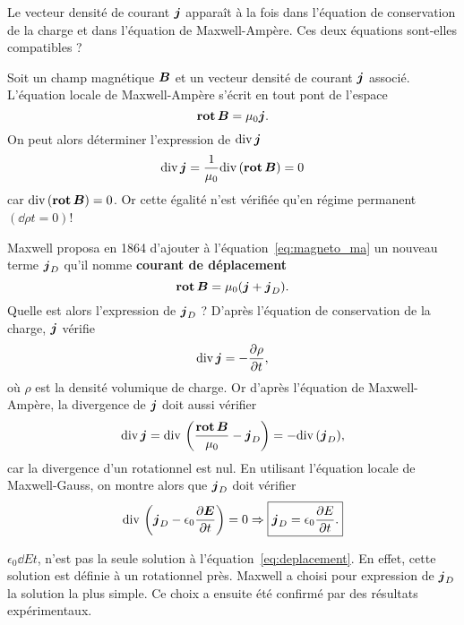 Le vecteur densité de courant $\vecj$ apparaît à la fois dans l'équation 
de conservation de la charge et dans l'équation de Maxwell-Ampère. Ces deux
équations sont-elles compatibles ?

Soit un champ magnétique $\vecb$ et un vecteur densité de courant $\vecj$ 
associé. L'équation locale de Maxwell-Ampère s'écrit en tout pont de l'espace
\begin{equation*}
	\rot \vecb = \mu_0 \vecj.
\end{equation*}
On peut alors déterminer l'expression de $\div \vecj$
\begin{equation*}
	\div \vecj = \dfrac{1}{\mu_0} \div(\rot \vecb) = 0
\end{equation*}
car $\div(\rot \vecb) = 0$. Or cette égalité n'est vérifiée qu'en régime permanent 
$\left(\dd{\rho}{t} = 0 \right)$!

Maxwell proposa en 1864 d'ajouter à l'équation~\ref{eq:magneto_ma} un nouveau terme 
$\vecj_D$ qu'il nomme \textbf{courant de déplacement}
\begin{equation*}
	\rot \vecb = \mu_0 (\vecj + \vecj_D).
\end{equation*}
Quelle est alors l'expression de $\vecj_D$ ? D'après l'équation de conservation 
de la charge, $\vecj$ vérifie 
\begin{equation*}
	\div \vecj = -\dd{\rho}{t},
\end{equation*}
où $\rho$ est la densité volumique de charge. Or d'après l'équation de Maxwell-Ampère, 
la divergence de $\vecj$ doit aussi vérifier
\begin{equation*}
	\div \vecj = \div \left(\dfrac{\rot \vecb}{\mu_0} - \vecj_D \right)
	        = - \div(\vecj_D),
\end{equation*}
car la divergence d'un rotationnel est nul.
En utilisant l'équation locale de Maxwell-Gauss, on montre alors
que $\vecj_D$ doit vérifier
\begin{equation}
	\div \left(\vecj_D - \epsilon_0 \dd{\vece}{t}\right) = 0 \Rightarrow 
	\boxed{\vecj_D = \epsilon_0 \dd{E}{t}.}
	\label{eq:deplacement}
\end{equation}

\begin{rema}
	$\epsilon_0 \dd{E}{t}$, n'est pas la seule solution à 
	l'équation~\ref{eq:deplacement}. En effet, cette solution est définie
	à un rotationnel près. Maxwell a choisi pour expression de $\vecj_D$
	la solution la plus simple. Ce choix a ensuite été confirmé par des 
	résultats expérimentaux.
\end{rema}

